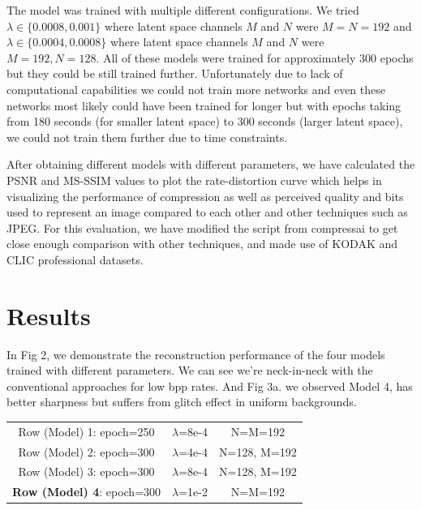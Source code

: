 \documentclass{article}
\begin{document}
The model was trained with multiple different configurations. We tried $\lambda \in \{0.0008, 0.001\}$ where latent space channels $M$ and $N$ were $M=N=192$ and $\lambda \in \{0.0004, 0.0008\}$ where latent space channels $M$ and $N$ were $M=192, N=128$.
All of these models were trained for approximately 300 epochs but they could be still trained further.
Unfortunately due to lack of computational capabilities we could not train more networks and even these networks most likely could have been trained for longer but with epochs taking from 180 seconds (for smaller latent space) to 300 seconds (larger latent space), we could not train them further due to time constraints.

After obtaining different models with different parameters, we have calculated the PSNR and MS-SSIM \cite{Bjntegaard2001CalculationOA, WangZhou2003Mssf} values to plot the rate-distortion curve which helps in visualizing the performance of compression as well as perceived quality and bits used to represent an image compared to each other and other techniques such as JPEG. For this evaluation, we have modified the script from compressai \cite{compressai} to get close enough comparison with other techniques, and made use of KODAK\cite{kodak} and CLIC professional \cite{clic} datasets.


\section{Results}
\label{sec:results}

In Fig 2, we demonstrate the reconstruction performance of the four models trained with different parameters. We can see we're neck-in-neck with the conventional approaches for low bpp rates. And Fig 3a. we observed Model 4, has better sharpness but suffers from glitch effect in uniform backgrounds.

\begin{table}[!h]
\label{table:models}
\begin{center}
\begin{tabular}{c c c}
    Row (Model) 1: epoch=250 & $\lambda$=8e-4 & N=M=192 \\
    Row (Model) 2: epoch=300 & $\lambda$=4e-4 & N=128, M=192 \\
    Row (Model) 3: epoch=300 & $\lambda$=8e-4 & N=128, M=192 \\
    \textbf{Row (Model) 4}: epoch=300 & $\lambda$=1e-2 & N=M=192 \\
\end{tabular}
\end{center}
\end{table}
\end{document}
